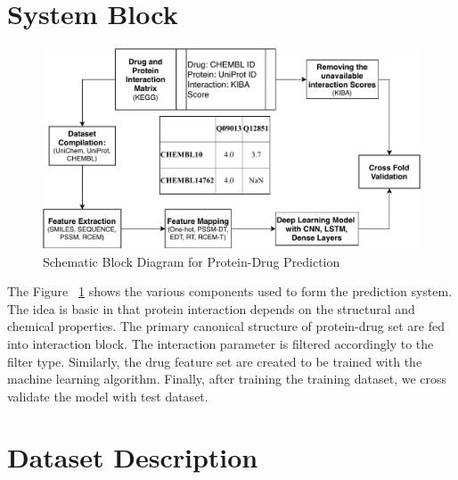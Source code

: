 \section{System Block}

\begin{figure}[h]
  \includegraphics[width=1\linewidth]{mainmatter/3-Methodology/images/block.pdf}
  \caption{Schematic Block Diagram for Protein-Drug Prediction}
  \label{fig:system}
\end{figure}

The Figure ~\ref{fig:system} shows the various components used to form the prediction system. The idea is basic in that protein interaction depends on the structural and chemical properties. The primary canonical structure of protein-drug set are fed into interaction block. The interaction parameter is filtered accordingly to the filter type. Similarly, the drug feature set are created to be trained with the machine learning algorithm. Finally, after training the training dataset, we cross validate the model with test dataset.


\section{Dataset Description}

